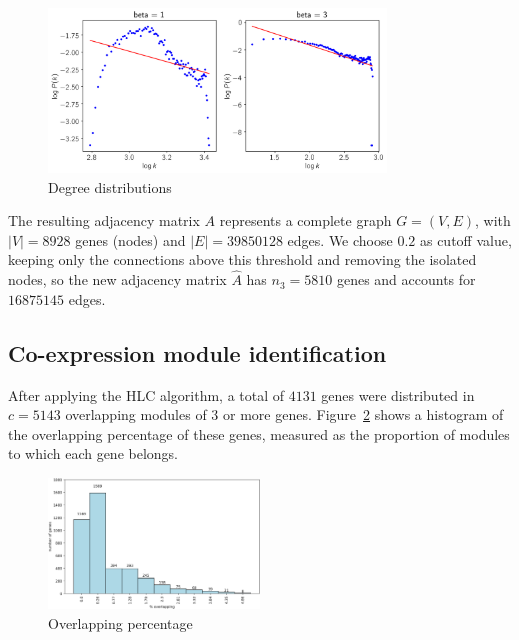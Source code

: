 \documentclass[12pt,journal, onecolumn]{IEEEtran}
\begin{document}
\begin{figure}[h]
  \centering
    \includegraphics[clip,width=0.8\textwidth]{Figures/pick_beta.png}
  \caption{Degree distributions}
  \label{fig:beta}
\end{figure}

The resulting adjacency matrix $A$ represents a complete graph $G=(V,E)$, with $|V| = 8928$ genes (nodes) and $|E| = 39850128$ edges. We choose $0.2$ as cutoff value, keeping only the connections above this threshold and removing the isolated nodes, so the new adjacency matrix $\hat{A}$ has $n_3 = 5810$ genes and accounts for $16875145$ edges.\\


\subsection{Co-expression module identification}
After applying the HLC algorithm, a total of $4131$ genes were distributed in $c = 5143$ overlapping modules of $3$ or more genes. Figure~\ref{fig:overlap} shows a histogram of the overlapping percentage of these genes, measured as the proportion of modules to which each gene belongs.

\begin{figure}[h]
  \centering
    \includegraphics[clip,width=0.5\textwidth]{Figures/artificial_modules.png}
  \caption{Overlapping percentage}
  \label{fig:overlap}
\end{figure}
\end{document}
